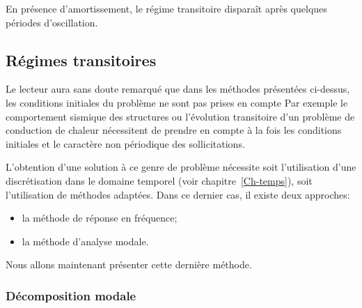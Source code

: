 \medskip
En présence d'amortissement, le régime transitoire disparaît après quelques périodes d'oscillation.






\medskip{}
\subsection{Régimes transitoires}\label{Sec-RT}

Le lecteur aura sans doute remarqué que dans les méthodes présentées ci-dessus, les conditions initiales du problème ne sont pas prises en compte Par exemple le comportement sismique des structures ou l'évolution transitoire d'un problème de conduction de chaleur nécessitent de prendre en compte à la fois les conditions initiales et le caractère non périodique des sollicitations.

L'obtention d'une solution à ce genre de problème nécessite soit l'utilisation d'une discrétisation dans le domaine temporel (voir chapitre~\ref{Ch-temps}), soit l'utilisation de méthodes adaptées. Dans ce dernier cas, il existe deux approches:
\begin{itemize}
  \item la méthode de réponse en fréquence;
  \item la méthode d'analyse modale.
\end{itemize}
Nous allons maintenant présenter cette dernière méthode.

\medskip
\subsubsection{Décomposition modale}

